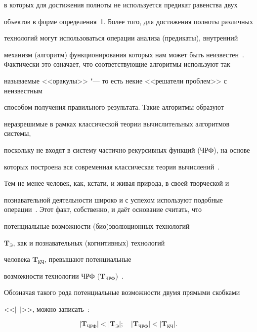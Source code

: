 в которых для достижения полноты не используется предикат равенства двух

объектов в форме определения~1. Более того, для достижения полноты различных

технологий могут использоваться операции анализа (предикаты), внутренний

механизм (алгоритм) функционирования которых нам может быть неизвестен~\cite{krylov:bib3,krylov:bib6}. Фактически это означает, что соответствующие алгоритмы используют так

называемые <<оракулы>> "--- то есть некие <<решатели проблем>> с неизвестным

способом получения правильного результата. Такие алгоритмы образуют

неразрешимые в рамках классической теории вычислительных алгоритмов системы,

поскольку не входят в систему частично рекурсивных функций (ЧРФ), на основе

которых построена вся современная классическая теория вычислений~\cite{krylov:bib14}. 

Тем не менее человек, как, кстати, и живая природа, в своей творческой и

познавательной деятельности широко и с успехом используют подобные операции~\cite{krylov:bib3,krylov:bib5,krylov:bib6}. Этот факт, собственно, и даёт основание считать, что

потенциальные возможности (био)эволюционных технологий

$\mathbf{T}_{\text{Э}}$, как и познавательных (когнитивных) технологий

человека $\mathbf{T}_{\text{КЧ}}$, превышают потенциальные

возможности технологии ЧРФ ($\mathbf{T}_{\text{ЧРФ}}$)~\cite{krylov:bib5,krylov:bib6}.

Обозначая такого рода потенциальные возможности двумя прямыми скобками

<<$|~~|$>>, можно записать~\cite{krylov:bib5,krylov:bib6}:

\begin{equation}

\label{krylov:eq5}

|\mathbf{T}_{\text{ЧРФ}}|< |\mathbf {T}_{\text{Э}} |; \quad

|\mathbf{T}_{\text{ЧРФ}} | < |\mathbf{T}_{\text{КЧ}}|.

\end{equation}




